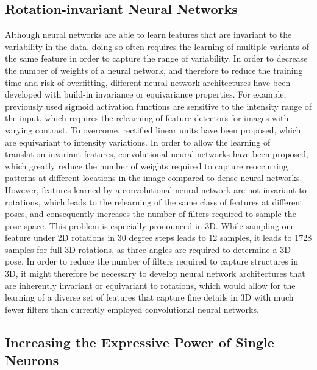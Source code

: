 \subsection[Rotation-invariant neural networks]{Rotation-invariant Neural
Networks}

Although neural networks are able to learn features that are invariant to the
variability in the data, doing so often requires the learning of multiple
variants of the same feature in order to capture the range of variability. In
order to decrease the number of weights of a neural network, and therefore to
reduce the training time and risk of overfitting, different neural network
architectures have been developed with build-in invariance or equivariance
properties. For example, previously used sigmoid activation functions are
sensitive to the intensity range of the input, which requires the relearning of
feature detectors for images with varying contrast. To overcome, rectified
linear units have been proposed, which are equivariant to intensity variations.
In order to allow the learning of translation-invariant features, convolutional
neural networks have been proposed, which greatly reduce the number of weights
required to capture reoccurring patterns at different locations in the image
compared to dense neural networks. However, features learned by a convolutional
neural network are not invariant to rotations, which leads to the relearning of
the same class of features at different poses, and consequently increases the
number of filters required to sample the pose space. This problem is especially
pronounced in 3D. While sampling one feature under 2D rotations in 30 degree
steps leads to 12 samples, it leads to 1728 samples for full 3D rotations, as
three angles are required to determine a 3D pose. In order to reduce the number
of filters required to capture structures in 3D, it might therefore be
necessary to develop neural network architectures that are inherently invariant
or equivariant to rotations, which would allow for the learning of a diverse set
of features that capture fine details in 3D with much fewer filters than
currently employed convolutional neural networks.

\subsection[Increasing the expressive power of single neurons]{Increasing the
Expressive Power of Single Neurons}

